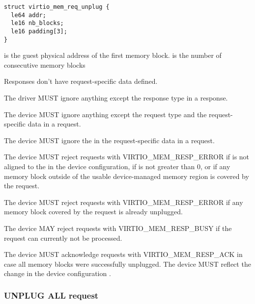 \begin{lstlisting}
struct virtio_mem_req_unplug {
  le64 addr;
  le16 nb_blocks;
  le16 padding[3];
}
\end{lstlisting}

 is the guest physical address of the first memory block.
 is the number of consecutive memory blocks

Responses don't have request-specific data defined.


The driver MUST ignore anything except the response type in a response.


The device MUST ignore anything except the request type and the
request-specific data in a request.

The device MUST ignore the  in the request-specific data in
a request.

The device MUST reject requests with VIRTIO_MEM_RESP_ERROR if 
is not aligned to the  in the device configuration, if
 is not greater than 0, or if any memory block outside of
the usable device-managed memory region is covered by the request.

The device MUST reject requests with VIRTIO_MEM_RESP_ERROR if any memory
block covered by the request is already unplugged.

The device MAY reject requests with VIRTIO_MEM_RESP_BUSY if the request can
currently not be processed.

The device MUST acknowledge requests with VIRTIO_MEM_RESP_ACK in case all
memory blocks were successfully unplugged.  The device MUST reflect the
change in the device configuration .

\subsubsection{UNPLUG ALL request}\label{sec:Device Types / Memory Device / Device Operation / UNPLUG ALL request}

